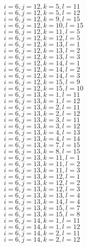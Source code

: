 \documentclass[14pt]{article}
\begin{document}
    $i=6,j=12,k=5,l=11 $ \\ 
    $i=6,j=12,k=5,l=12 $ \\ 
    $i=6,j=12,k=9,l=15 $ \\ 
    $i=6,j=12,k=10,l=15 $ \\ 
    $i=6,j=12,k=11,l=5 $ \\ 
    $i=6,j=12,k=12,l=5 $ \\ 
    $i=6,j=12,k=13,l=1 $ \\ 
    $i=6,j=12,k=13,l=2 $ \\ 
    $i=6,j=12,k=13,l=3 $ \\ 
    $i=6,j=12,k=14,l=1 $ \\ 
    $i=6,j=12,k=14,l=2 $ \\ 
    $i=6,j=12,k=14,l=3 $ \\ 
    $i=6,j=12,k=15,l=9 $ \\ 
    $i=6,j=12,k=15,l=10 $ \\ 
    $i=6,j=13,k=1,l=11 $ \\ 
    $i=6,j=13,k=1,l=12 $ \\ 
    $i=6,j=13,k=2,l=11 $ \\ 
    $i=6,j=13,k=2,l=12 $ \\ 
    $i=6,j=13,k=3,l=11 $ \\ 
    $i=6,j=13,k=3,l=12 $ \\ 
    $i=6,j=13,k=4,l=13 $ \\ 
    $i=6,j=13,k=4,l=14 $ \\ 
    $i=6,j=13,k=7,l=15 $ \\ 
    $i=6,j=13,k=8,l=15 $ \\ 
    $i=6,j=13,k=11,l=1 $ \\ 
    $i=6,j=13,k=11,l=2 $ \\ 
    $i=6,j=13,k=11,l=3 $ \\ 
    $i=6,j=13,k=12,l=1 $ \\ 
    $i=6,j=13,k=12,l=2 $ \\ 
    $i=6,j=13,k=12,l=3 $ \\ 
    $i=6,j=13,k=13,l=4 $ \\ 
    $i=6,j=13,k=14,l=4 $ \\ 
    $i=6,j=13,k=15,l=7 $ \\ 
    $i=6,j=13,k=15,l=8 $ \\ 
    $i=6,j=14,k=1,l=11 $ \\ 
    $i=6,j=14,k=1,l=12 $ \\ 
    $i=6,j=14,k=2,l=11 $ \\ 
    $i=6,j=14,k=2,l=12 $ \\ 
\end{document}
